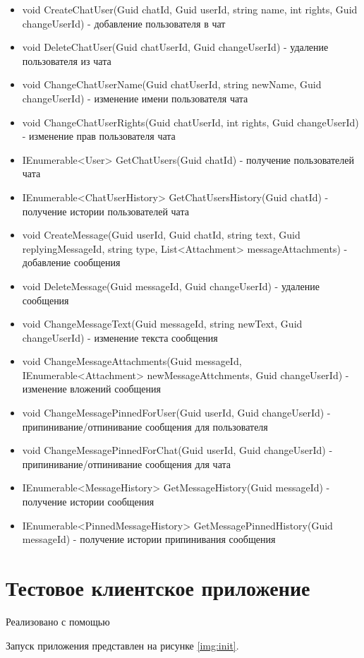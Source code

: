 \begin{itemize}
\item void CreateChatUser(Guid chatId, Guid userId, string name, int rights, Guid changeUserId) - добавление пользователя в чат
\item void DeleteChatUser(Guid chatUserId, Guid changeUserId) - удаление пользователя из чата
\item void ChangeChatUserName(Guid chatUserId, string newName, Guid changeUserId) - изменение имени пользователя чата
\item void ChangeChatUserRights(Guid chatUserId, int rights, Guid changeUserId) - изменение прав пользователя чата
\item IEnumerable<User> GetChatUsers(Guid chatId) - получение пользователей чата
\item IEnumerable<ChatUserHistory> GetChatUsersHistory(Guid chatId) - получение истории пользователей чата
\item void CreateMessage(Guid userId, Guid chatId, string text, Guid replyingMessageId, string type, List<Attachment> messageAttachments) - добавление сообщения
\item void DeleteMessage(Guid messageId, Guid changeUserId) - удаление сообщения
\item void ChangeMessageText(Guid messageId, string newText, Guid changeUserId) - изменение текста сообщения
\item void ChangeMessageAttachments(Guid messageId, IEnumerable<Attachment> newMessageAttchments, Guid changeUserId) - изменение вложений сообщения
\item void ChangeMessagePinnedForUser(Guid userId, Guid changeUserId) - припинивание/отпинивание сообщения для пользователя
\item void ChangeMessagePinnedForChat(Guid userId, Guid changeUserId) - припинивание/отпинивание сообщения для чата
\item IEnumerable<MessageHistory> GetMessageHistory(Guid messageId) - получение истории сообщения
\item IEnumerable<PinnedMessageHistory> GetMessagePinnedHistory(Guid messageId) - получение истории припинивания сообщения
\end{itemize}

\section{\textbf{Тестовое клиентское приложение }}

Реализовано с помощью 

Запуск приложения представлен на рисунке \ref{img:init}. 


